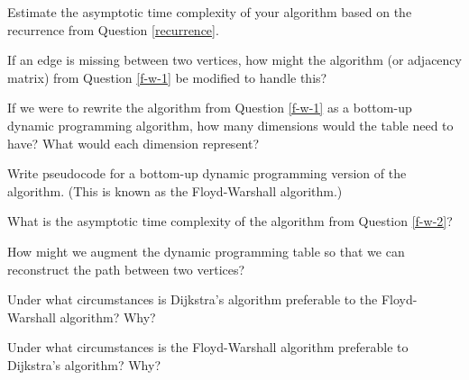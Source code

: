 \documentclass{tufte-handout}
\begin{document}
\begin{questions}
\item Estimate the asymptotic time complexity of your algorithm based on the recurrence from Question \ref{recurrence}.

\item If an edge is missing between two vertices, how might the algorithm (or adjacency matrix) from Question \ref{f-w-1} be modified to handle this?

\item If we were to rewrite the algorithm from Question \ref{f-w-1} as a bottom-up dynamic programming algorithm, how many dimensions would the table need to have? What would each dimension represent?

\item Write pseudocode for a bottom-up dynamic programming version of the algorithm. (This is known as the Floyd-Warshall algorithm.) \label{f-w-2}

\newpage

\item What is the asymptotic time complexity of the algorithm from Question \ref{f-w-2}?

\item How might we augment the dynamic programming table so that we can reconstruct the path between two vertices?

\item Under what circumstances is Dijkstra's algorithm preferable to the Floyd-Warshall algorithm? Why?

\item Under what circumstances is the Floyd-Warshall algorithm preferable to Dijkstra's algorithm? Why?

\end{questions}
\end{document}

